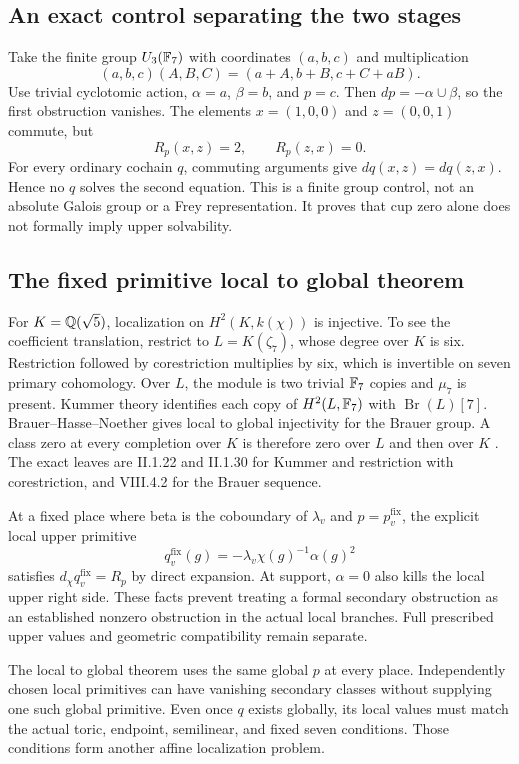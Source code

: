 \subsection{An exact control separating the two stages}
Take the finite group $U_3(\mathbb F_7)$ with coordinates $(a,b,c)$ and multiplication
\[
(a,b,c)(A,B,C)=(a+A,b+B,c+C+aB).
\]
Use trivial cyclotomic action, $\alpha=a$, $\beta=b$, and $p=c$. Then $dp=-\alpha\cup\beta$, so the first obstruction vanishes. The elements $x=(1,0,0)$ and $z=(0,0,1)$ commute, but
\[
R_p(x,z)=2,\qquad R_p(z,x)=0.
\]
For every ordinary cochain $q$, commuting arguments give $dq(x,z)=dq(z,x)$. Hence no $q$ solves the second equation. This is a finite group control, not an absolute Galois group or a Frey representation. It proves that cup zero alone does not formally imply upper solvability.

\subsection{The fixed primitive local to global theorem}
For $K=\mathbb Q(\sqrt5)$, localization on $H^2(K,k(\chi))$ is injective. To see the coefficient translation, restrict to $L=K(\zeta_7)$, whose degree over $K$ is six. Restriction followed by corestriction multiplies by six, which is invertible on seven primary cohomology. Over $L$, the module is two trivial $\mathbb F_7$ copies and $\mu_7$ is present. Kummer theory identifies each copy of $H^2(L,\mathbb F_7)$ with $\operatorname{Br}(L)[7]$. Brauer--Hasse--Noether gives local to global injectivity for the Brauer group. A class zero at every completion over $K$ is therefore zero over $L$ and then over $K$ \cite{milneCFT2020}. The exact leaves are II.1.22 and II.1.30 for Kummer and restriction with corestriction, and VIII.4.2 for the Brauer sequence.

At a fixed place where beta is the coboundary of $\lambda_v$ and $p=p_v^{\mathrm{fix}}$, the explicit local upper primitive
\[
q_v^{\mathrm{fix}}(g)=-\lambda_v\chi(g)^{-1}\alpha(g)^2
\]
satisfies $d_\chi q_v^{\mathrm{fix}}=R_p$ by direct expansion. At support, $\alpha=0$ also kills the local upper right side. These facts prevent treating a formal secondary obstruction as an established nonzero obstruction in the actual local branches. Full prescribed upper values and geometric compatibility remain separate.

The local to global theorem uses the same global $p$ at every place. Independently chosen local primitives can have vanishing secondary classes without supplying one such global primitive. Even once $q$ exists globally, its local values must match the actual toric, endpoint, semilinear, and fixed seven conditions. Those conditions form another affine localization problem.

